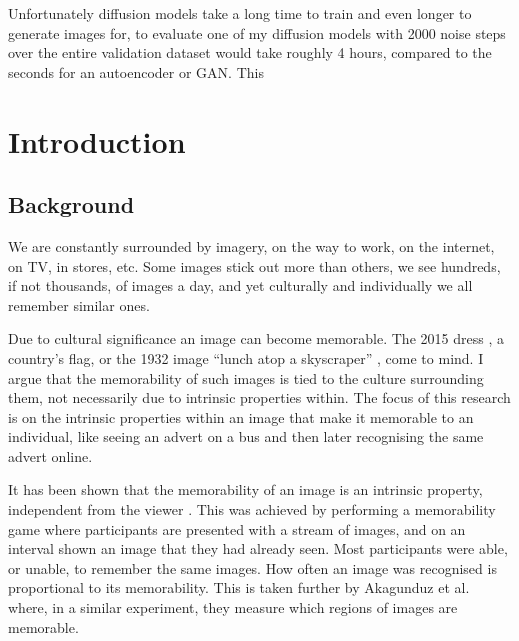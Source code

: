 \documentclass{UoYCSproject}
\begin{document}
Unfortunately diffusion models take a long time to train and even longer to generate images for, to evaluate one of my diffusion models with 2000 noise steps over the entire validation dataset would take roughly 4 hours, compared to the seconds for an autoencoder or GAN. This  

\chapter{Introduction}


\section{Background}


We are constantly surrounded by imagery, on the way to work, on the internet, on TV, in stores, etc. Some images stick out more than others, we see hundreds, if not thousands, of images a day, and yet culturally and individually we all remember similar ones.


Due to cultural significance an image can become memorable. The 2015 dress \cite{BBCDress2015}, a country's flag, or the 1932 image “lunch atop a skyscraper” \cite{gambino_2012}, come to mind. I argue that the memorability of such images is tied to the culture surrounding them, not necessarily due to intrinsic properties within. The focus of this research is on the intrinsic properties within an image that make it memorable to an individual, like seeing an advert on a bus and then later recognising the same advert online.



It has been shown that the memorability of an image is an intrinsic property, independent from the viewer \cite{Isola2011, IsolaParikhTorralbaOliva2011, ICCV15_Khosla, isola2014memorability}. This was achieved by performing a memorability game where participants are presented with a stream of images, and on an interval shown an image that they had already seen. Most participants were able, or unable, to remember the same images.
How often an image was recognised is proportional to its memorability. %
This is taken further by Akagunduz et al. \cite{VischemaPaper} where, in a similar experiment, they measure which regions of images are memorable.
\end{document}

